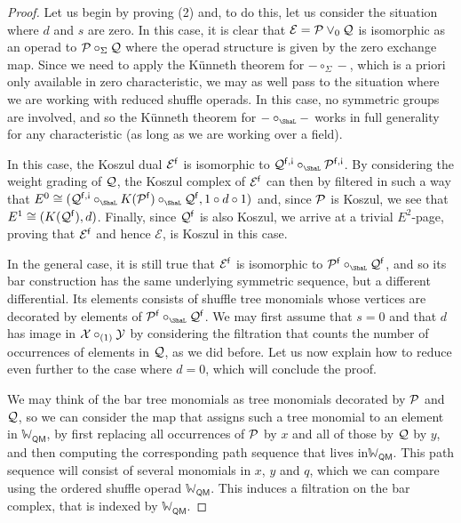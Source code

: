 \begin{proof}
Let us begin by proving (2) and, to do this, 
let us consider the situation
where $d$ and $s$ are zero. In this case,
it is clear that $\mathcal E =\mathcal P\vee_0 \mathcal{Q}$ 
is isomorphic
as an operad to $\mathcal P\circ_\Sigma \mathcal{Q}$
where the operad structure is given
by the zero exchange map. Since we 
need to apply the K\"unneth theorem 
for $-\circ_\Sigma-$, which is a priori
only available in zero characteristic,
we may as well pass to the situation
where we are working with reduced shuffle
operads. In this case, no symmetric groups
are involved, and so the K\"unneth theorem 
for $-\circ_\Sha-$ works in full generality
for any characteristic (as long as we are
working over a field).

In this case, the Koszul dual $\mathcal E^{\mathsf{f}}$ is isomorphic to 
$\QQ^{\f,\antishriek}\circ_\Sha\PP^{\f,\antishriek}$.
By considering the weight grading of $\mathcal{Q}$,
the Koszul complex of $\mathcal E^{\mathsf{f}}$ can
then by filtered in such a way that
$E^0 \cong (\QQ^{\f,\antishriek}\circ_\Sha K(\PP^\f) \circ_\Sha \QQ^\f, 1\circ d\circ 1)$
and, since $\mathcal P$ is Koszul, we see that 
$E^1 \cong (K(\mathcal{Q}^{\mathsf{f}}),d)$.
Finally, since $\mathcal{Q}^{\mathsf{f}}$ is also Koszul, 
we arrive at
a trivial $E^2$-page, proving that $\mathcal{E}^{\mathsf{f}}$
and hence $\mathcal E$, is Koszul in this case. 

In the general case, it is still true
that $\mathcal{E}^{\mathsf{f}}$ is isomorphic to $\PP^\f\circ_\Sha\QQ^\f$,
and so its bar construction has the same underlying
symmetric sequence, but a different differential.
Its elements consists of shuffle tree monomials
whose vertices are decorated by elements of 
$\PP^\f\circ_\Sha\QQ^\f$. We may first
assume that $s=0$ and that $d$ has image in
$\mathcal{X}\circ_{(1)}\mathcal{Y}$ by considering
the filtration that counts the number
of occurrences of elements in $\mathcal{Q}$,
as we did before. Let us now explain how
to reduce even further to the case where
$d=0$, which will conclude the proof.

We may think of the bar tree monomials as tree
monomials decorated by $\mathcal P$ and $\mathcal{Q}$,
so we can consider the map that assigns
such a tree monomial to an element
in ${\mathbb W}_\mathsf{QM}$, by
first replacing all occurrences of $\mathcal P$
by $x$ and all of those by $\mathcal{Q}$ by $y$,
and then computing the corresponding
path sequence that lives in${\mathbb W}_\mathsf{QM}$. This path sequence will consist of several
monomials in $x$, $y$ and $q$, which we can
compare using the ordered shuffle operad
${\mathbb W}_\mathsf{QM}$. This induces
a filtration on the bar complex, that is
indexed by ${\mathbb W}_\mathsf{QM}$.


\end{proof}
